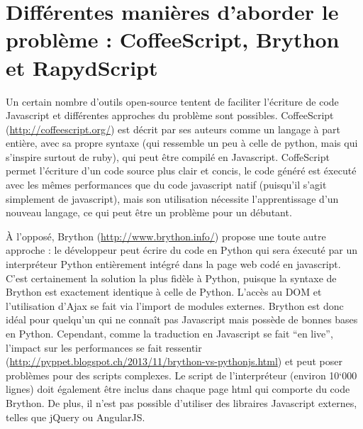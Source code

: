 \documentclass[letterpaper,10pt,french]{sphinxmanual}
\begin{document}
\section{Différentes manières d'aborder le problème : CoffeeScript, Brython et RapydScript}
\label{rapydscript:differentes-manieres-d-aborder-le-probleme-coffeescript-brython-et-rapydscript}
Un certain nombre d'outils open-source tentent de faciliter l'écriture de code Javascript et différentes approches du problème sont possibles. CoffeeScript (\href{http://coffeescript.org/}{http://coffeescript.org/}) est décrit par ses auteurs comme un langage à part entière, avec sa propre syntaxe (qui ressemble un peu à celle de python, mais qui s'inspire surtout de ruby), qui peut être compilé en Javascript. CoffeScript permet l'écriture d'un code source plus clair et concis, le code généré est éxecuté avec les mêmes performances que du code javascript natif (puisqu'il s'agit simplement de javascript), mais son utilisation nécessite l'apprentissage d'un nouveau langage, ce qui peut être un problème pour un débutant.

À l'opposé, Brython (\href{http://www.brython.info/}{http://www.brython.info/}) propose une toute autre approche : le développeur peut écrire du code en Python qui sera éxecuté par un interpréteur Python entièrement intégré dans la page web codé en javascript. C'est certainement la solution la plus fidèle à Python, puisque la syntaxe de Brython est exactement identique à celle de Python. L'accès au DOM et l'utilisation d'Ajax se fait via l'import de modules externes. Brython est donc idéal pour quelqu'un qui ne connaît pas Javascript mais possède de bonnes bases en Python. Cependant, comme la traduction en Javascript se fait ``en live'', l'impact sur les performances se fait ressentir (\href{http://pyppet.blogspot.ch/2013/11/brython-vs-pythonjs.html}{http://pyppet.blogspot.ch/2013/11/brython-vs-pythonjs.html}) et peut poser problèmes pour des scripts complexes. Le script de l'interpréteur (environ 10`000 lignes) doit également être inclus dans chaque page html qui comporte du code Brython. De plus, il n'est pas possible d'utiliser des libraires Javascript externes, telles que jQuery ou AngularJS.
\end{document}
